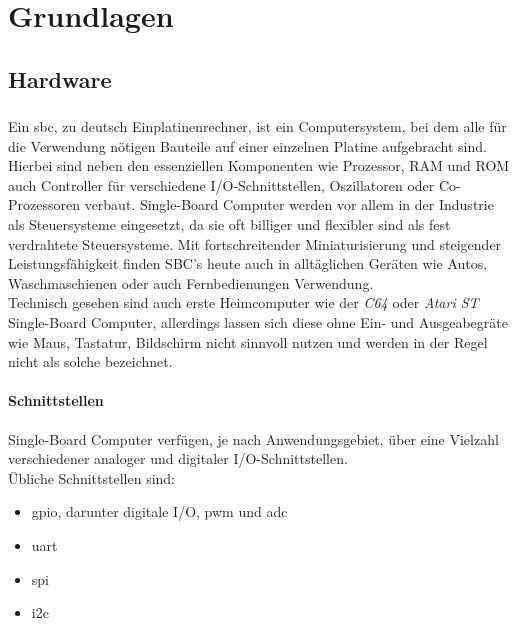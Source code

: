 \chapter{Grundlagen}

\section{Hardware}

\subsection{}
Ein \gls{sbc}, zu deutsch Einplatinenrechner, ist ein Computersystem, bei dem alle für die Verwendung nötigen Bauteile auf einer einzelnen Platine aufgebracht sind. Hierbei sind neben den essenziellen Komponenten wie Prozessor, RAM und ROM auch Controller für verschiedene I/O-Schnittstellen, Oszillatoren oder Co-Prozessoren verbaut. Single-Board Computer werden vor allem in der Industrie als Steuersysteme eingesetzt, da sie oft billiger und flexibler sind als fest verdrahtete Steuersysteme. Mit fortschreitender Miniaturisierung und steigender Leistungsfähigkeit finden SBC's heute auch in alltäglichen Geräten wie Autos, Waschmaschienen oder auch Fernbedienungen Verwendung.\\

Technisch gesehen sind auch erste Heimcomputer wie der \emph{C64} oder \emph{Atari ST} Single-Board Computer, allerdings lassen sich diese ohne Ein- und Ausgeabegräte wie Maus, Tastatur, Bildschirm nicht sinnvoll nutzen und werden in der Regel nicht als solche bezeichnet.


\subsubsection{Schnittstellen}
Single-Board Computer verfügen, je nach Anwendungsgebiet, über eine Vielzahl verschiedener analoger und digitaler I/O-Schnittstellen.\\

\noindent Übliche Schnittstellen sind:

\begin{itemize}
  \item \gls{gpio}, darunter digitale I/O, \gls{pwm} und \gls{adc}
  \item \gls{uart}
  \item \gls{spi}
  \item \gls{i2c}
\end{itemize}

